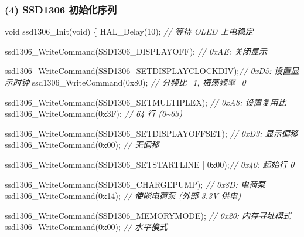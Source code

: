 \documentclass[
  chinese,
  UTF8,
  oneside,
  openany]{ctexbook}
\newenvironment{Shaded}{}{}
\newcommand{\BaseNTok}[1]{\textcolor[rgb]{0.25,0.63,0.44}{#1}}
\newcommand{\CommentTok}[1]{\textcolor[rgb]{0.38,0.63,0.69}{\textit{#1}}}
\newcommand{\DataTypeTok}[1]{\textcolor[rgb]{0.56,0.13,0.00}{#1}}
\newcommand{\DecValTok}[1]{\textcolor[rgb]{0.25,0.63,0.44}{#1}}
\newcommand{\NormalTok}[1]{#1}
\newcommand{\OperatorTok}[1]{\textcolor[rgb]{0.40,0.40,0.40}{#1}}
\begin{document}
\subsubsection{(4) SSD1306
初始化序列}\label{ssd1306-ux521dux59cbux5316ux5e8fux5217}

\begin{Shaded}
\begin{Highlighting}[]
\DataTypeTok{void}\NormalTok{ ssd1306\_Init}\OperatorTok{(}\DataTypeTok{void}\OperatorTok{)}
\OperatorTok{\{}
\NormalTok{    HAL\_Delay}\OperatorTok{(}\DecValTok{10}\OperatorTok{);}  \CommentTok{// 等待 OLED 上电稳定}

\NormalTok{    ssd1306\_WriteCommand}\OperatorTok{(}\NormalTok{SSD1306\_DISPLAYOFF}\OperatorTok{);}       \CommentTok{// 0xAE: 关闭显示}

\NormalTok{    ssd1306\_WriteCommand}\OperatorTok{(}\NormalTok{SSD1306\_SETDISPLAYCLOCKDIV}\OperatorTok{);}\CommentTok{// 0xD5: 设置显示时钟}
\NormalTok{    ssd1306\_WriteCommand}\OperatorTok{(}\BaseNTok{0x80}\OperatorTok{);}                      \CommentTok{// 分频比=1, 振荡频率=0}

\NormalTok{    ssd1306\_WriteCommand}\OperatorTok{(}\NormalTok{SSD1306\_SETMULTIPLEX}\OperatorTok{);}      \CommentTok{// 0xA8: 设置复用比}
\NormalTok{    ssd1306\_WriteCommand}\OperatorTok{(}\BaseNTok{0x3F}\OperatorTok{);}                      \CommentTok{// 64 行 (0\textasciitilde{}63)}

\NormalTok{    ssd1306\_WriteCommand}\OperatorTok{(}\NormalTok{SSD1306\_SETDISPLAYOFFSET}\OperatorTok{);}  \CommentTok{// 0xD3: 显示偏移}
\NormalTok{    ssd1306\_WriteCommand}\OperatorTok{(}\BaseNTok{0x00}\OperatorTok{);}                      \CommentTok{// 无偏移}

\NormalTok{    ssd1306\_WriteCommand}\OperatorTok{(}\NormalTok{SSD1306\_SETSTARTLINE }\OperatorTok{|} \BaseNTok{0x00}\OperatorTok{);}\CommentTok{// 0x40: 起始行 0}

\NormalTok{    ssd1306\_WriteCommand}\OperatorTok{(}\NormalTok{SSD1306\_CHARGEPUMP}\OperatorTok{);}        \CommentTok{// 0x8D: 电荷泵}
\NormalTok{    ssd1306\_WriteCommand}\OperatorTok{(}\BaseNTok{0x14}\OperatorTok{);}                      \CommentTok{// 使能电荷泵 (外部 3.3V 供电)}

\NormalTok{    ssd1306\_WriteCommand}\OperatorTok{(}\NormalTok{SSD1306\_MEMORYMODE}\OperatorTok{);}        \CommentTok{// 0x20: 内存寻址模式}
\NormalTok{    ssd1306\_WriteCommand}\OperatorTok{(}\BaseNTok{0x00}\OperatorTok{);}                      \CommentTok{// 水平模式}


\end{Highlighting}
\end{Shaded}
\end{document}
